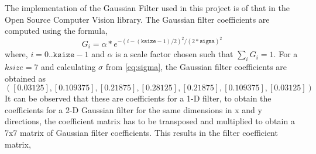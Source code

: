 \documentclass[a4paper]{article}
\begin{document}
The implementation of the Gaussian Filter used in this project is of that in the Open Source Computer Vision library. The Gaussian filter coefficients are computed using the formula,
\begin{equation}
    G_i= \alpha *e^{-(i-( \texttt{ksize} -1)/2)^2/(2* \texttt{sigma} )^2}
\end{equation}
where, $ i=0..\texttt{ksize}-1$ and $\alpha$ is a scale factor chosen such that $ \sum_i G_i=1.$ 
For a $ksize=7$ and calculating $\sigma$ from \autoref{eq:sigma}, the Gaussian filter coefficients are obtained as \[([0.03125 ],
       [0.109375],
       [0.21875 ],
       [0.28125 ],
       [0.21875 ],
       [0.109375],
       [0.03125 ])\]
It can be observed that these are coefficients for a 1-D filter, to obtain the coefficients for a 2-D Gaussian filter for the same dimensions in x and y directions, the coefficient matrix has to be transposed and multiplied to obtain a 7x7 matrix of Gaussian filter coefficients. This results in the filter coefficient matrix,

\begin{table}[H] \label{tab:coeff}
\caption{7x7 Gaussian Filter Coefficients}
\end{table}
\end{document}
